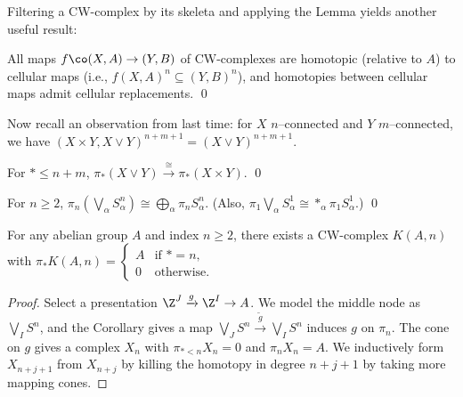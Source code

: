 Filtering a CW-complex by its skeleta and applying the Lemma yields another useful result:
\begin{corollary}
All maps $f\co (X, A) \to (Y, B)$ of CW-complexes are homotopic (relative to $A$) to cellular maps (i.e., $f(X, A)^n \subseteq (Y, B)^n$), and homotopies between cellular maps admit cellular replacements. \qed
\end{corollary}

Now recall an observation from last time: for $X$ $n$--connected and $Y$ $m$--connected, we have $(X \times Y, X \vee Y)^{n+m+1} = (X \vee Y)^{n+m+1}$.

\begin{corollary}
For $* \le n+m$, $\pi_*(X \vee Y) \xrightarrow\cong \pi_*(X \times Y)$. \qed
\end{corollary}

\begin{corollary}
For $n \ge 2$, $\pi_n(\bigvee_\alpha S^n_\alpha) \cong \bigoplus_\alpha \pi_n S^n_\alpha$.  (Also, $\pi_1 \bigvee_\alpha S^1_\alpha \cong *_\alpha \pi_1 S^1_\alpha$.) \qed
\end{corollary}

\begin{lemma}
For any abelian group $A$ and index $n \ge 2$, there exists a CW-complex $K(A, n)$ with $\pi_* K(A, n) = \begin{cases} A & \text{if $* = n$}, \\ 0 & \text{otherwise}. \end{cases}$
\end{lemma}
\begin{proof}
Select a presentation $\Z^J \xrightarrow g \Z^I \to A$.  We model the middle node as $\bigvee_I S^n$, and the Corollary gives a map $\bigvee_J S^n \xrightarrow{\widetilde g} \bigvee_I S^n$ induces $g$ on $\pi_n$.  The cone on $g$ gives a complex $X_n$ with $\pi_{* < n} X_n = 0$ and $\pi_n X_n = A$.  We inductively form $X_{n+j+1}$ from $X_{n+j}$ by killing the homotopy in degree $n+j+1$ by taking more mapping cones.
\end{proof}

